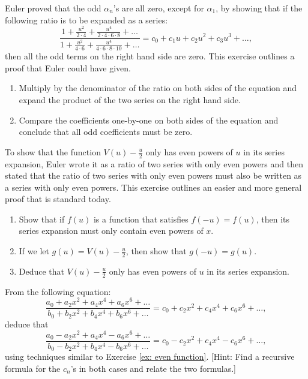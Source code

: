 
\begin{exercise} \label{ex: even function}
    Euler proved that the odd $\alpha_n$'s are all zero, except for $\alpha_1$, by showing that if the following ratio is to be expanded as a series:
    $$\frac{1 + \frac{u^2}{2\cdot 4} + \frac{u^4}{2\cdot 4 \cdot 6 \cdot 8} + \dots}{1 + \frac{u^2}{4 \cdot 6} + \frac{u^4}{4\cdot 6 \cdot 8 \cdot 10} + \dots} = c_0 + c_1 u + c_2 u^2 + c_3 u^3 + \dots,$$
    then all the odd terms on the right hand side are zero. This exercise outlines a proof that Euler could have given.
    \begin{enumerate}[label=(\alph*)]
        \item Multiply by the denominator of the ratio on both sides of the equation and expand the product of the two series on the right hand side.
        \item Compare the coefficients one-by-one on both sides of the equation and conclude that all odd coefficients must be zero.
    \end{enumerate}
\end{exercise}

\begin{exercise}
    To show that the function $V(u) - \frac{u}{2}$ only has even powers of $u$ in its series expansion, Euler wrote it as a ratio of two series with only even powers and then stated that the ratio of two series with only even powers must also be written as a series with only even powers. This exercise outlines an easier and more general proof that is standard today. 
    \begin{enumerate}[label=(\alph*)]
        \item Show that if $f(u)$ is a function that satisfies $f(-u)= f(u)$, then its series expansion must only contain even powers of $x$.
        \item If we let $g(u) = V(u) - \frac{u }{2}$, then show that $g(-u) = g(u)$.
        \item Deduce that $V(u) - \frac{u}{2}$ only has even powers of $u$ in its series expansion.
    \end{enumerate}
\end{exercise}

\begin{exercise} \label{ex: alternate signs}
    From the following equation:
    $$\frac{\displaystyle a_0 + a_2x^2 + a_4 x^4 + a_6 x^6 + \dots}{\displaystyle b_0 + b_2x^2 + b_4 x^4 + b_6 x^6 + \dots} = c_0 + c_2 x^2 + c_4 x^4 + c_6 x^6 + \dots,$$
    deduce that 
    $$\frac{\displaystyle a_0 - a_2x^2 + a_4 x^4 - a_6 x^6 + \dots}{\displaystyle b_0 - b_2x^2 + b_4 x^4 - b_6 x^6 + \dots} = c_0 - c_2 x^2 + c_4 x^4 - c_6 x^6 + \dots,$$
    using techniques similar to Exercise \ref{ex: even function}. [Hint: Find a recursive formula for the $c_n$'s in both cases and relate the two formulas.]
\end{exercise}

